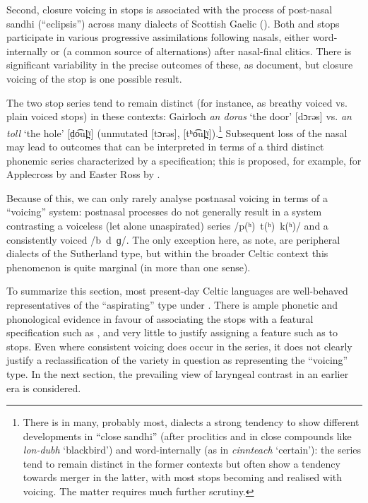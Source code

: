 \documentclass[output=paper,colorlinks,citecolor=brown]{langscibook}
\begin{document}
Second, closure voicing in stops is associated with the process of post\hyp nasal sandhi (\enquote{eclipsis}) across many dialects of Scottish Gaelic (\cite{maolalaigh1996gaelic,bosch09:_fine_scott_gaelic}). Both  and  stops participate in various progressive assimilations following nasals, either word\hyp internally or (a common source of alternations) after nasal\hyp final clitics. There is significant variability in the precise outcomes of these, as \textcite{bosch09:_fine_scott_gaelic} document, but closure voicing of the stop is one possible result.

The two stop series tend to remain distinct (for instance, as breathy voiced vs. plain voiced stops) in these contexts: Gairloch \parencite{wentworth} \textit{an doras} `{the door}' [dɔrəs] vs. \textit{an toll} `{the hole}' [d̤o͡ul̪ˠ] (unmutated [tɔrəs], [tʰo͡ul̪ˠ]).\footnote{There is in many, probably most, dialects a strong tendency to show different developments in \enquote{close sandhi} (after proclitics and in close compounds like \textit{lon-dubh} `{blackbird}') and word-internally (as in \textit{cinnteach} `{certain}'): the series tend to remain distinct in the former contexts but often show a tendency towards merger in the latter, with most stops becoming  and realised with voicing. The matter requires much further scrutiny.} Subsequent loss of the nasal may lead to outcomes that can be interpreted in terms of a third distinct phonemic series characterized by a  specification; this is proposed, for example, for Applecross by \textcite{ternes06:_scott_gaelic_applec_ross} and Easter Ross by \textcite{watson2022easter}.

Because of this, we can only rarely analyse postnasal voicing in terms of a \enquote{voicing} system: postnasal processes do not generally result in a system contrasting a voiceless (let alone unaspirated)  series /p(ʰ)~t(ʰ)~k(ʰ)/ and a consistently voiced  /b~d~ɡ/. The only exception here, as \textcite{bosch2009fine} note, are peripheral dialects of the Sutherland type, but within the broader Celtic context this phenomenon is quite marginal (in more than one sense).

To summarize this section, most present\hyp day Celtic languages are well\hyp behaved representatives of the \enquote{aspirating} type under . There is ample phonetic and phonological evidence in favour of associating the  stops with a featural specification such as , and very little to justify assigning a feature such as  to  stops. Even where consistent voicing does occur in the  series, it does not clearly justify a reclassification of the variety in question as representing the \enquote{voicing} type. In the next section, the prevailing view of laryngeal contrast in an earlier era is considered.
\end{document}
